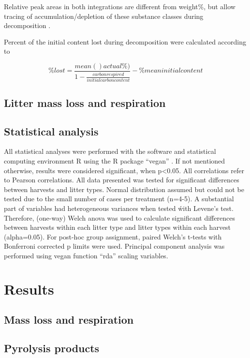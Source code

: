 \documentclass[preprint,review,12pt]{elsarticle}
\begin{document}
Relative peak areas in both integrations are different from weight\%, but allow tracing of accumulation/depletion of these substance classes during decomposition \citep{Kuder1998}. 

Percent of the initial content lost during decomposition were calculated according to

\begin{equation}
\% lost = \frac {mean()actual \%)} {1-\frac{carbon respired}{initial carbon content}} - \% mean initial content
\end{equation}

\subsection{Litter mass loss and respiration}

\subsection{Statistical analysis}
All statistical analyses were performed with the software and statistical computing environment R using the R package ``vegan'' \citep{Oksanen2011}. If not mentioned otherwise, results were considered significant, when p\textless 0.05. All correlations refer to Pearson correlations.
All data presented was tested for significant differences between harvests and litter types. Normal distribution assumed but could not be tested due to the small number of cases per treatment (n=4-5). A substantial part of variables had heterogeneous variances when tested ẃith Levene's test. Therefore, (one-way) Welch anova was used to calculate significant differences between harvests within each litter type and litter types within each harvest (alpha=0.05). For post-hoc group assignment, paired Welch's t-tests with Bonferroni corrected p limits were used. Principal component analysis was performed using vegan function ``rda'' scaling variables.

\section{Results}

\subsection{Mass loss and respiration}

\subsection{Pyrolysis products}
\end{document}
